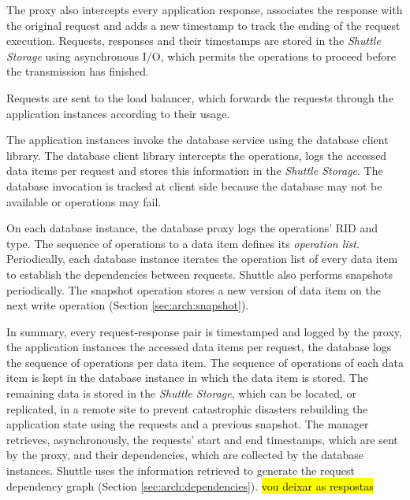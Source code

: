 The proxy also intercepts every application response, associates the response with the original request and adds a new timestamp to track the ending of the request execution. Requests, responses and their timestamps are stored in the \emph{Shuttle Storage} using asynchronous I/O, which permits the operations to proceed before the transmission has finished. 

Requests are sent to the load balancer, which forwards the requests through the application instances according to their usage.


The application instances invoke the database service using the database client library. The database client library intercepts the operations, logs the accessed data items per request and stores this information in the \emph{Shuttle Storage}. The database invocation is tracked at client side because the database may not be available or operations may fail.

On each database instance, the database proxy logs the operations' \ac{RID} and type. The sequence of operations to a data item defines its \emph{operation list}. Periodically, each database instance iterates the operation list of every data item to establish the dependencies between requests. Shuttle also performs snapshots periodically. The snapshot operation stores a new version of data item on the next write operation (Section \ref{sec:arch:snapshot}).


In summary, every request-response pair is timestamped and logged by the proxy, the application instances the accessed data items per request, the database logs the sequence of operations per data item. The sequence of operations of each data item is kept in the database instance in which the data item is stored. The remaining data is stored in the \emph{Shuttle Storage}, which can be located, or replicated, in a remote site to prevent catastrophic disasters rebuilding the application state using the requests and a previous snapshot. The manager retrieves, asynchronously, the requests' start and end timestamps, which are sent by the proxy, and their dependencies, which are collected by the database instances. Shuttle uses the information retrieved to generate the request dependency graph (Section \ref{sec:arch:dependencies}). \hl{vou deixar as respostas }






